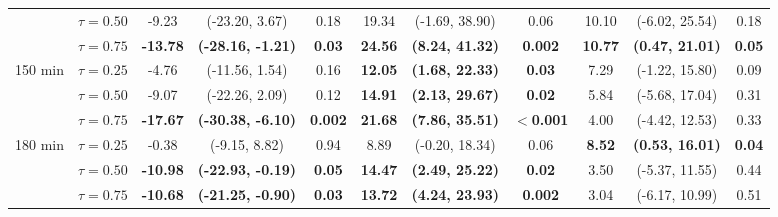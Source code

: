 \begin{table}[ht]
{\begin{tabular}{llccccccccc}
 & $\tau=0.50$ & -9.23 & (-23.20, 3.67) & 0.18 & 19.34 & (-1.69, 38.90) & 0.06 & 10.10 & (-6.02, 25.54) & 0.18 \\
 & $\tau=0.75$ & \textbf{-13.78} & \textbf{(-28.16, -1.21)} & \textbf{0.03} & \textbf{24.56} & \textbf{(8.24, 41.32)} & \textbf{0.002} & \textbf{10.77} & \textbf{(0.47, 21.01)} & \textbf{0.05} \\
\midrule
\multirow{3}{*}{150 min} & $\tau=0.25$ & -4.76 & (-11.56, 1.54) & 0.16 & \textbf{12.05} & \textbf{(1.68, 22.33)} & \textbf{0.03} & 7.29 & (-1.22, 15.80) & 0.09 \\
 & $\tau=0.50$ & -9.07 & (-22.26, 2.09) & 0.12 & \textbf{14.91} & \textbf{(2.13, 29.67)} & \textbf{0.02} & 5.84 & (-5.68, 17.04) & 0.31 \\
 & $\tau=0.75$ & \textbf{-17.67} & \textbf{(-30.38, -6.10)} & \textbf{0.002} & \textbf{21.68} & \textbf{(7.86, 35.51)} & \textbf{$<$0.001} & 4.00 & (-4.42, 12.53) & 0.33 \\
\midrule
\multirow{3}{*}{180 min} & $\tau=0.25$ & -0.38 & (-9.15, 8.82) & 0.94 & 8.89 & (-0.20, 18.34) & 0.06 & \textbf{8.52} & \textbf{(0.53, 16.01)} & \textbf{0.04} \\
 & $\tau=0.50$ & \textbf{-10.98} & \textbf{(-22.93, -0.19)} & \textbf{0.05} & \textbf{14.47} & \textbf{(2.49, 25.22)} & \textbf{0.02} & 3.50 & (-5.37, 11.55) & 0.44 \\
 & $\tau=0.75$ & \textbf{-10.68} & \textbf{(-21.25, -0.90)} & \textbf{0.03} & \textbf{13.72} & \textbf{(4.24, 23.93)} & \textbf{0.002} & 3.04 & (-6.17, 10.99) & 0.51 \\
\bottomrule
\end{tabular}%
}
\end{table}

